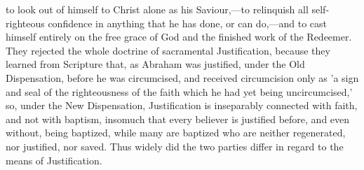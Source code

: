 \documentclass[
]{book}
\begin{document}
to look out of himself to Christ alone as his Saviour,---to relinquish all self-righteous confidence in anything that he has done, or can do,---and to cast himself entirely on the free grace of God and the finished work of the Redeemer. They rejected the whole doctrine of sacramental Justification, because they learned from Scripture that, as Abraham was justified, under the Old Dispensation, before he was circumcised, and received circumcision only as 'a sign and seal of the righteousness of the faith which he had yet being uncircumcised,' so, under the New Dispensation, Justification is inseparably connected with faith, and not with baptism, insomuch that every believer is justified before, and even without, being baptized, while many are baptized who are neither regenerated, nor justified, nor saved. Thus widely did the two parties differ in regard to the means of Justification.
\end{document}
